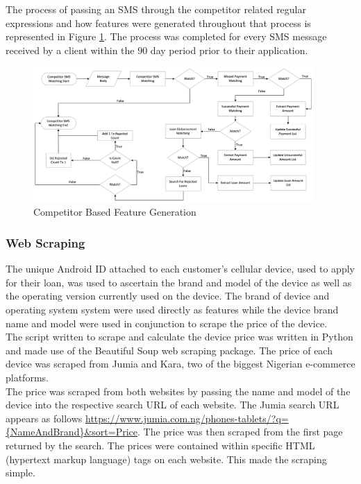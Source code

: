 \vspace{10pt}

The process of passing an SMS through the competitor related regular expressions and how features were generated throughout that process is represented in Figure \ref{fig:comp_features}. The process was completed for every SMS message received by a client within the 90 day period prior to their application. 

\vspace{10pt}

\begin{figure}[!htb]
\centering
\includegraphics[width=0.95\textwidth]{images/comp_feats.png}
\caption{Competitor Based Feature Generation}
\label{fig:comp_features}
\end{figure}

\vspace{10pt}


\subsubsection{Web Scraping}

The unique Android ID attached to each customer's cellular device, used to apply for their loan, was used to ascertain the brand and model of the device as well as the operating version currently used on the device. The brand of device and operating system system were used directly as features while the device brand name and model were used in conjunction to scrape the price of the device. \\

The script written to scrape and calculate the device price was written in Python and made use of the Beautiful Soup web scraping package. The price of each device was scraped from Jumia and Kara, two of the biggest Nigerian e-commerce platforms. \\

The price was scraped from both websites by passing the name and model of the device into the respective search URL of each website. The Jumia search URL appears as follows \url{https://www.jumia.com.ng/phones-tablets/?q={NameAndBrand}&sort=Price}. The price was then scraped from the first page returned by the search. The prices were contained within specific HTML (hypertext markup language) tags on each website. This made the scraping simple. \\

